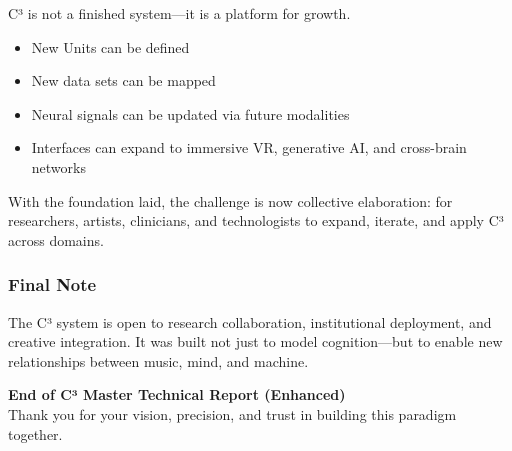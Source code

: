 C³ is not a finished system—it is a platform for growth.

\begin{itemize}
    \item New Units can be defined
    \item New data sets can be mapped
    \item Neural signals can be updated via future modalities
    \item Interfaces can expand to immersive VR, generative AI, and cross-brain networks
\end{itemize}

With the foundation laid, the challenge is now collective elaboration: for researchers, artists, clinicians, and technologists to expand, iterate, and apply C³ across domains.

\subsubsection*{Final Note}

The C³ system is open to research collaboration, institutional deployment, and creative integration. It was built not just to model cognition—but to enable new relationships between music, mind, and machine.

\vspace{1cm}
\begin{center}
\Large \textbf{End of C³ Master Technical Report (Enhanced)}\\[0.2cm]
\large Thank you for your vision, precision, and trust in building this paradigm together.
\end{center}













